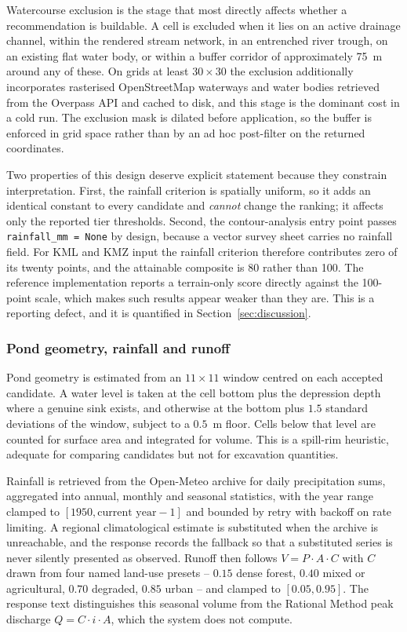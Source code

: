 \documentclass[sigconf,review,10pt]{acmart}
\begin{document}
Watercourse exclusion is the stage that most directly affects whether a
recommendation is buildable. A cell is excluded when it lies on an active
drainage channel, within the rendered stream network, in an entrenched
river trough, on an existing flat water body, or within a buffer corridor
of approximately 75~m around any of these. On grids at least $30\times30$
the exclusion additionally incorporates rasterised OpenStreetMap
waterways and water bodies retrieved from the Overpass API and cached to
disk, and this stage is the dominant cost in a cold run. The exclusion
mask is dilated before application, so the buffer is enforced in grid
space rather than by an ad hoc post-filter on the returned coordinates.

Two properties of this design deserve explicit statement because they
constrain interpretation. First, the rainfall criterion is spatially
uniform, so it adds an identical constant to every candidate and
\emph{cannot} change the ranking; it affects only the reported tier
thresholds. Second, the contour-analysis entry point passes
\texttt{rainfall\_mm = None} by design, because a vector survey sheet
carries no rainfall field. For KML and KMZ input the rainfall criterion
therefore contributes zero of its twenty points, and the attainable
composite is 80 rather than 100. The reference implementation reports a
terrain-only score directly against the 100-point scale, which makes
such results appear weaker than they are. This is a reporting defect, and
it is quantified in Section~\ref{sec:discussion}.

\subsubsection{Pond geometry, rainfall and runoff}

Pond geometry is estimated from an $11\times11$ window centred on each
accepted candidate. A water level is taken at the cell bottom plus the
depression depth where a genuine sink exists, and otherwise at the
bottom plus $1.5$ standard deviations of the window, subject to a
$0.5$~m floor. Cells below that level are counted for surface area and
integrated for volume. This is a spill-rim heuristic, adequate for
comparing candidates but not for excavation quantities.

Rainfall is retrieved from the Open-Meteo archive for daily precipitation
sums, aggregated into annual, monthly and seasonal statistics, with the
year range clamped to $[1950, \text{current year}-1]$ and bounded by
retry with backoff on rate limiting. A regional climatological estimate is
substituted when the archive is unreachable, and the response records the
fallback so that a substituted series is never silently presented as
observed. Runoff then follows $V = P \cdot A \cdot C$ with $C$ drawn from
four named land-use presets -- $0.15$ dense forest, $0.40$ mixed or
agricultural, $0.70$ degraded, $0.85$ urban -- and clamped to
$[0.05, 0.95]$. The response text distinguishes this seasonal volume from
the Rational Method peak discharge $Q = C \cdot i \cdot A$, which the
system does not compute.
\end{document}
